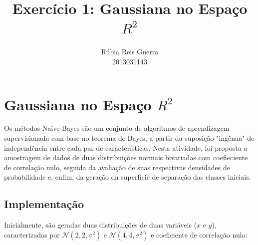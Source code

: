 \documentclass{article}
\title{Exercício 1: Gaussiana no Espaço $R^2$}
\author{Rúbia Reis Guerra \\ 2013031143}
\begin{document}

\maketitle

\section{Gaussiana no Espaço $R^2$}
Os métodos Naive Bayes são um conjunto de algoritmos de aprendizagem supervisionada com base no teorema de Bayes, a partir da suposição "ingênua" de independência entre cada par de características. Nesta atividade, foi proposta a amostragem de dados de duas distribuições normais bivariadas com coefieciente de correlação nulo, seguida da avaliação de suas respectivas densidades de probabilidade e, enfim, da geração da superfície de separação das classes iniciais.


\subsection{Implementação}
Inicialmente, são geradas duas distribuições de duas variáveis ($x$ e $y$), caracterizadas por $\mathcal{N}(2,2,\sigma^2)$ e $\mathcal{N}(4,4,\sigma^2)$ e coeficiente de correlação nulo:
\end{document}
